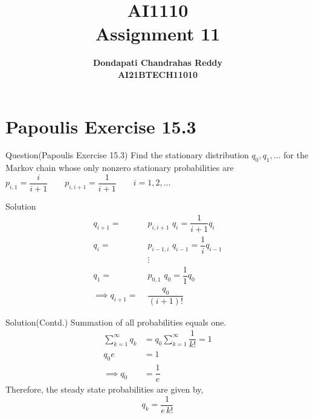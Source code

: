 \documentclass{beamer}
\title{\textbf{AI1110 \\ Assignment 11} }
\author{\textbf{Dondapati Chandrahas Reddy}\\\textbf{AI21BTECH11010}}
\begin{document}
	

\begin{frame}
	\titlepage 
\end{frame}


\section{Papoulis Exercise 15.3}
\begin{frame}{Question(Papoulis Exercise 15.3)}
	Find the stationary distribution $q_0, q_1 ,...$ for the Markov chain whose only nonzero stationary probabilities are\\[1em]
	\hspace{4em} $p_{i,1} = \dfrac{i}{i+1} \hspace{2em} p_{i,i+1} = \dfrac{1}{i+1} \hspace{2em} i = 1,2,...$
\end{frame}

\begin{frame}{Solution}
	\begin{align}
		q_{i+1} =\,\, &p_{i,i+1}\,\, q_i = \dfrac{1}{i+1}q_i\\[1ex]
		q_{i} = \,\, &p_{i-1,i}\,\, q_{i-1} = \dfrac{1}{i}q_{i-1}\\
		& \vdots \nonumber\\
		q_{1} = \,\, &p_{0,1}\,\, q_{0} = \dfrac{1}{1}q_{0}\\[1em]
		\implies q_{i+1} =\,\, &\dfrac{q_0}{(i+1)!}
	\end{align}
\end{frame}

\begin{frame}{Solution(Contd.)}
	Summation of all probabilities equals one.
	\begin{align}
		\sum\limits_{k=1}^{\infty} q_k &=  q_0 \sum\limits_{k=1}^{\infty} \dfrac{1}{k!} = 1\\[1ex]
		q_0e &= 1 \\[1ex]
		\implies q_0 &= \dfrac{1}{e}
	\end{align}
	Therefore, the steady state probabilities are given by,\\
	\begin{equation}
		q_k = \dfrac{1}{e\,k!}
	\end{equation}
\end{frame}
\end{document}
